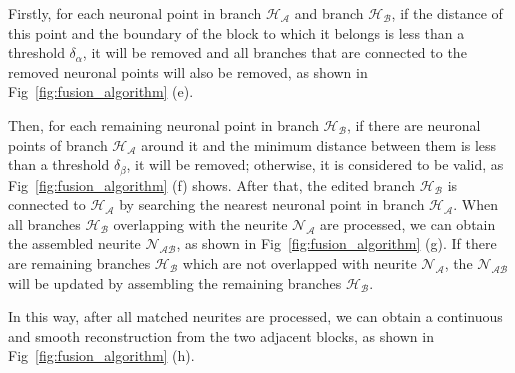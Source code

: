 Firstly, for each neuronal point in branch $\mathcal{H_A}$ and branch $\mathcal{H_B}$, if the distance of this point and the boundary of the block to which it belongs is less than a threshold $\delta_{\alpha}$, it will be removed and all branches that are connected to the removed neuronal points will also be removed, as shown in Fig~\ref{fig:fusion_algorithm} (e).

Then, for each remaining neuronal point in branch $\mathcal{H_B}$, if there are neuronal points of branch $\mathcal{H_A}$ around it and the minimum distance between them is less than a threshold $\delta_{\beta}$, it will be removed; otherwise, it is considered to be valid, as Fig~\ref{fig:fusion_algorithm} (f) shows. 
After that, the edited branch $\mathcal{H_B}$ is connected to $\mathcal{H_A}$ by searching the nearest neuronal point in branch $\mathcal{H_A}$.
%
When all branches $\mathcal{H_B}$ overlapping with the neurite $\mathcal{N_A}$ are processed, we can obtain the assembled neurite $\mathcal{N_{AB}}$, as shown in Fig~\ref{fig:fusion_algorithm} (g).
If there are remaining branches $\mathcal{H_B}$ which are not overlapped with neurite $\mathcal{N_A}$, the $\mathcal{N_{AB}}$ will be updated by assembling the remaining branches $\mathcal{H_B}$.

In this way, after all matched neurites are processed, we can obtain a continuous and smooth reconstruction from the two adjacent blocks, as shown in Fig~\ref{fig:fusion_algorithm} (h).

